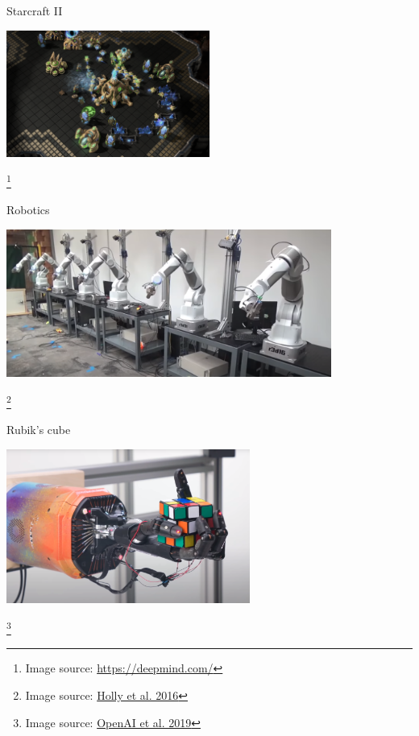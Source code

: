 \documentclass[aspectratio=169]{../latex_main/tntbeamer}  %
\begin{document}
\begin{frame}[c]{Starcraft II }
	
	\centering
	\includegraphics[width=0.5\textwidth]{images/starcraftii.png}
	
\footnote{Image source: \url{https://deepmind.com/}}
	
\end{frame}
\begin{frame}[c]{Robotics }
	
	\centering
	\includegraphics[width=0.8\textwidth]{images/robotic.png}
	
	\footnote{Image source: \href{https://www.youtube.com/watch?v=ZhsEKTo7V04}{Holly et al. 2016}}
	
\end{frame}
\begin{frame}[c]{Rubik's cube }
	
	\centering
	\includegraphics[width=0.6\textwidth]{images/rubiks_cube.png}
	
	\footnote{Image source: \href{https://openai.com/blog/solving-rubiks-cube/}{OpenAI et al. 2019}}
	
\end{frame}
\end{document}
